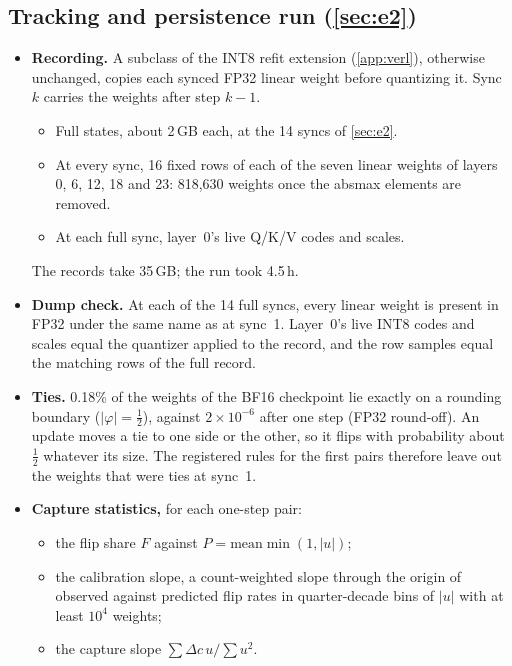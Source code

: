 \subsection{Tracking and persistence run (\texorpdfstring{\cref{sec:e2}}{Section 6.4})}\label{app:e2-details}
\begin{itemize}[leftmargin=*,itemsep=2pt]
\item \textbf{Recording.} A subclass of the INT8 refit extension (\cref{app:verl}), otherwise unchanged, copies each synced FP32 linear weight before quantizing it. Sync $k$ carries the weights after step $k-1$.
  \begin{itemize}[leftmargin=*,itemsep=1pt]
  \item Full states, about 2\,GB each, at the 14 syncs of \cref{sec:e2}.
  \item At every sync, 16 fixed rows of each of the seven linear weights of layers 0, 6, 12, 18 and 23: 818{,}630 weights once the absmax elements are removed.
  \item At each full sync, layer~0's live Q/K/V codes and scales.
  \end{itemize}
  The records take 35\,GB; the run took 4.5\,h.
\item \textbf{Dump check.} At each of the 14 full syncs, every linear weight is present in FP32 under the same name as at sync~1. Layer~0's live INT8 codes and scales equal the quantizer applied to the record, and the row samples equal the matching rows of the full record.
\item \textbf{Ties.} 0.18\% of the weights of the BF16 checkpoint lie exactly on a rounding boundary ($|\varphi|=\tfrac12$), against $2\times10^{-6}$ after one step (FP32 round-off). An update moves a tie to one side or the other, so it flips with probability about $\tfrac12$ whatever its size. The registered rules for the first pairs therefore leave out the weights that were ties at sync~1.
\item \textbf{Capture statistics,} for each one-step pair:
  \begin{itemize}[leftmargin=*,itemsep=1pt]
  \item the flip share $F$ against $P=\mathrm{mean}\min(1,|u|)$;
  \item the calibration slope, a count-weighted slope through the origin of observed against predicted flip rates in quarter-decade bins of $|u|$ with at least $10^4$ weights;
  \item the capture slope $\sum\Delta c\,u/\sum u^2$.
  \end{itemize}

\end{itemize}
